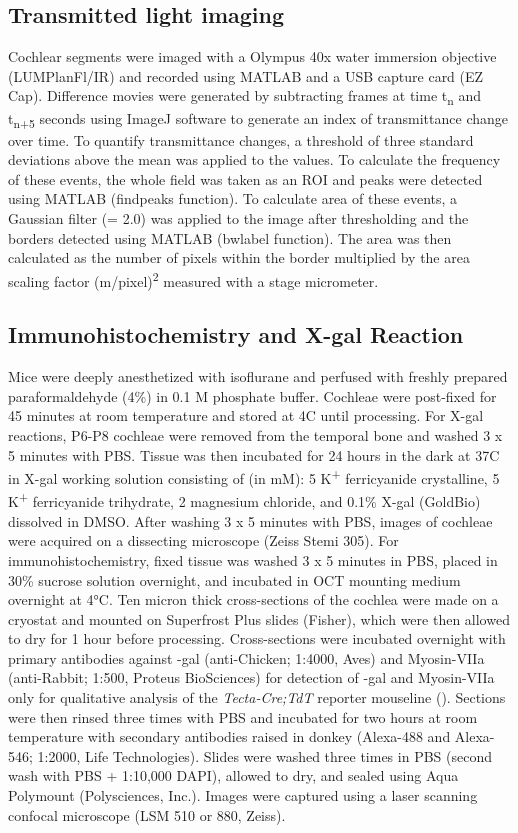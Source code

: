\documentclass[9pt,lineno]{elife}
\begin{document}
\subsection{Transmitted light imaging}
Cochlear segments were imaged with a Olympus 40x water immersion objective (LUMPlanFl/IR) and recorded using MATLAB and a USB capture card (EZ Cap). Difference movies were generated by subtracting frames at time t\textsubscript{n} and t\textsubscript{n+5} seconds using ImageJ software to generate an index of transmittance change over time. To quantify transmittance changes, a threshold of three standard deviations above the mean was applied to the values. To calculate the frequency of these events, the whole field was taken as an ROI and peaks were detected using MATLAB (findpeaks function). To calculate area of these events, a Gaussian filter (\textsigma = 2.0) was applied to the image after thresholding and the borders detected using MATLAB (bwlabel function). The area was then calculated as the number of pixels within the border multiplied by the area scaling factor (\textmu m/pixel)\textsuperscript{2} measured with a stage micrometer.

\subsection{Immunohistochemistry and X-gal Reaction}
Mice were deeply anesthetized with isoflurane and perfused with freshly prepared paraformaldehyde (4\%) in 0.1 M phosphate buffer. Cochleae were post-fixed for 45 minutes at room temperature and stored at 4\textdegree C until processing. For X-gal reactions, P6-P8 cochleae were removed from the temporal bone and washed 3 x 5 minutes with PBS. Tissue was then incubated for 24 hours in the dark at 37\textdegree C in X-gal working solution consisting of (in mM): 5 K\textsuperscript{+} ferricyanide crystalline, 5 K\textsuperscript{+} ferricyanide trihydrate, 2 magnesium chloride, and 0.1\% X-gal (GoldBio) dissolved in DMSO. After washing 3 x 5 minutes with PBS, images of cochleae were acquired on a dissecting microscope (Zeiss Stemi 305). For immunohistochemistry, fixed tissue was washed 3 x 5 minutes in PBS, placed in 30\% sucrose solution overnight, and incubated in OCT mounting medium overnight at 4°C. Ten micron thick cross-sections of the cochlea were made on a cryostat and mounted on Superfrost Plus slides (Fisher), which were then allowed to dry for 1 hour before processing. Cross-sections were incubated overnight with primary antibodies against \textbeta-gal (anti-Chicken; 1:4000, Aves) and Myosin-VIIa (anti-Rabbit; 1:500, Proteus BioSciences) for detection of \textbeta-gal and Myosin-VIIa only for qualitative analysis of the \textit{Tecta-Cre;TdT} reporter mouseline (). Sections were then rinsed three times with PBS and incubated for two hours at room temperature with secondary antibodies raised in donkey (Alexa-488 and Alexa-546; 1:2000, Life Technologies). Slides were washed three times in PBS (second wash with PBS + 1:10,000 DAPI), allowed to dry, and sealed using Aqua Polymount (Polysciences, Inc.). Images were captured using a laser scanning confocal microscope (LSM 510 or 880, Zeiss).
\end{document}
